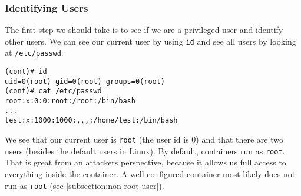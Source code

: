 \subsubsection{Identifying Users}\label{subsubsection:user-enumeration}
The first step we should take is to see if we are a privileged user and identify other users. We can see our current user by using \lstinline{id} and see all users by looking at \lstinline{/etc/passwd}.
\begin{lstlisting}[caption={User enumeration.},captionpos=b]
(cont)# id
uid=0(root) gid=0(root) groups=0(root)
(cont)# cat /etc/passwd
root:x:0:0:root:/root:/bin/bash
...
test:x:1000:1000:,,,:/home/test:/bin/bash
\end{lstlisting}

We see that our current user is \lstinline{root} (the user id is 0) and that there are two users (besides the default users in Linux). By default, containers run as \lstinline{root}. That is great from an attackers perspective, because it allows us full access to everything inside the container. A well configured container most likely does not run as \lstinline{root} (see \autoref{subsection:non-root-user}).
